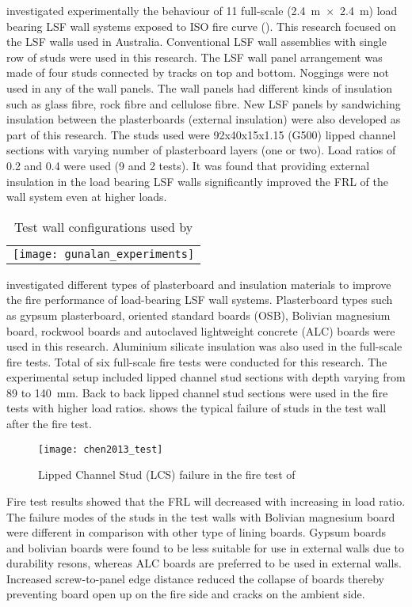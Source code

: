 \citet{Gunalan2013e} investigated experimentally the behaviour of 11 full-scale (2.4~m~$\times$~2.4~m) load bearing LSF wall systems exposed to ISO fire curve (). This research focused on the LSF walls used in Australia. Conventional LSF wall assemblies with single row of studs were used in this research. The LSF wall panel arrangement was made of four studs connected by tracks on top and bottom. Noggings were not used in any of the wall panels. The wall panels had different kinds of insulation such as glass fibre, rock fibre and cellulose fibre. New LSF panels by sandwiching insulation between the plasterboards (external insulation) were also developed as part of this research. The studs used were 92x40x15x1.15 (G500) lipped channel sections with varying number of plasterboard layers (one or two). Load ratios of 0.2 and 0.4 were used (9 and 2 tests). It was found that providing external insulation in the load bearing LSF walls significantly improved the FRL of the wall system even at higher loads. 
\begin{table}
	\centering
	\caption{Test wall configurations used by \citet{Gunalan2013e}}
		\begin{tabular}{c}
			\texttt{[image: gunalan\_experiments]}	
			\label{tab:gunalan_experiments}
		\end{tabular}
\end{table}

\citet{Chen2013} investigated different types of plasterboard and insulation materials to improve the fire performance of load-bearing LSF wall systems. Plasterboard types such as gypsum plasterboard, oriented standard boards (OSB), Bolivian magnesium board, rockwool boards and autoclaved lightweight concrete (ALC) boards were used in this research. Aluminium silicate insulation was also used in the full-scale fire tests. Total of six full-scale fire tests were conducted for this research. The experimental setup included lipped channel stud sections with depth varying from 89 to 140~mm. Back to back lipped channel stud sections were used in the fire tests with higher load ratios.  shows the typical failure of studs in the test wall after the fire test. 
\begin{figure}[htbp]
	\centering
		\texttt{[image: chen2013\_test]}		
		\caption{Lipped Channel Stud (LCS) failure in the fire test of \citet{Chen2013}}
		\label{fig:chen2013_test}
\end{figure}
Fire test results showed that the FRL will decreased with increasing in load ratio. The failure modes of the studs in the test walls with Bolivian magnesium board were different in comparison with other type of lining boards. Gypsum boards and bolivian boards were found to be less suitable for use in external walls due to durability resons, whereas ALC boards are preferred to be used in external walls. Increased screw-to-panel edge distance reduced the collapse of boards thereby preventing board open up on the fire side and cracks on the ambient side. 

